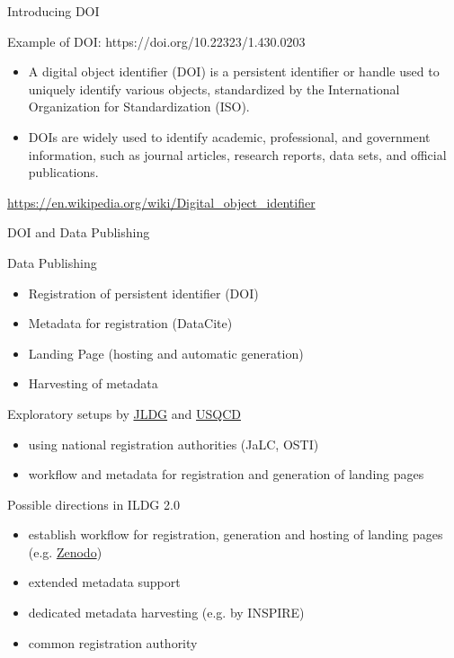 \documentclass[aspectratio=169,xcolor=dvipsnames]{beamer}
\begin{document}
\begin{frame}{Introducing DOI}

Example of DOI: \newline
https://doi.org/10.22323/1.430.0203 

\vspace{1 cm}
\begin{itemize}
    \item A digital object identifier (DOI) is a persistent identifier or handle used to uniquely identify various objects, standardized by the International Organization for Standardization (ISO).

\item  DOIs are widely used to identify academic, professional, and government information, such as journal articles, research reports, data sets, and official publications. 
    
\end{itemize}

\url{https://en.wikipedia.org/wiki/Digital_object_identifier}

\end{frame}

\begin{frame}{DOI and Data Publishing}
  \begin{block}{Data Publishing}
    \begin{itemize}
    \item Registration of persistent identifier (DOI)
    \item Metadata for registration (DataCite)
    \item Landing Page (hosting and automatic generation)
    \item Harvesting of metadata
    \end{itemize}
  \end{block}

  Exploratory setups by \href{https://www.jldg.org/DOI}{JLDG} and
  \href{https://www.osti.gov/dataexplorer/search/product-type:Dataset/semantic:Lattice QCD}{USQCD}
  \begin{itemize}
  \item using national registration authorities (JaLC, OSTI)
  \item workflow and metadata for registration and generation of landing pages
  \end{itemize}

  Possible directions in ILDG 2.0
  \begin{itemize}
  \item establish workflow for registration, generation and hosting of landing pages
    (e.g. \href{https://zenodo.org/communities/ildg}{Zenodo})
  \item extended metadata support
  \item dedicated metadata harvesting (e.g. by INSPIRE)
  \item common registration authority
  \end{itemize}
  
\end{frame}
    
\end{document}
